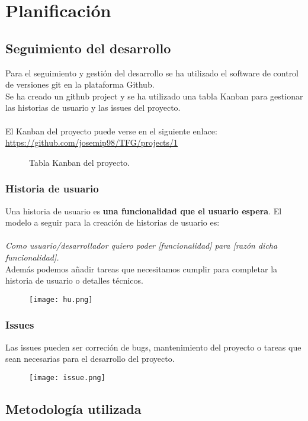 \chapter{Planificación}

\section{Seguimiento del desarrollo}
Para el seguimiento y gestión del desarrollo se ha utilizado el software de control de versiones
git en la plataforma Github.
\\
Se ha creado un github project y se ha utilizado una tabla Kanban para gestionar las historias 
de usuario y las issues del proyecto.
\\\\
El Kanban del proyecto puede verse en el siguiente enlace:
\url{https://github.com/josemip98/TFG/projects/1}

\begin{figure}[H]
  \centering
  \noindent{}
  \caption{Tabla Kanban del proyecto.}
\end{figure}

\subsection{Historia de usuario}\label{subsec:hu}
Una historia de usuario es \textbf{una funcionalidad que el usuario espera}.
El modelo a seguir para la creación de historias de usuario es:
\\\\
\textit{Como usuario/desarrollador quiero poder [funcionalidad] para [razón dicha funcionalidad].}\\

Además podemos añadir tareas que necesitamos cumplir para completar la historia de usuario o detalles técnicos.

\begin{figure}[H]
	\centering	
	\texttt{[image: hu.png]}
	\end{figure}

\subsection{Issues}\label{subsec:issue}
Las issues pueden ser correción de bugs, mantenimiento del proyecto o tareas que sean necesarias para el desarrollo del proyecto.

\begin{figure}[H]
	\centering	
	\texttt{[image: issue.png]}
	\end{figure}

\section{Metodología utilizada}

